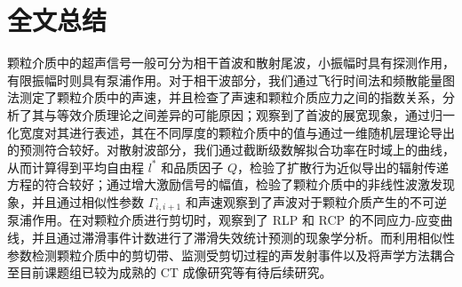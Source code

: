 
\chapter{全文总结}

颗粒介质中的超声信号一般可分为相干首波和散射尾波，小振幅时具有探测作用，有限振幅时则具有泵浦作用。对于相干波部分，我们通过飞行时间法和频散能量图法测定了颗粒介质中的声速，并且检查了声速和颗粒介质应力之间的指数关系，分析了其与等效介质理论之间差异的可能原因；观察到了首波的展宽现象，通过归一化宽度对其进行表述，其在不同厚度的颗粒介质中的值与通过一维随机层理论导出的预测符合较好。对散射波部分，我们通过截断级数解拟合功率在时域上的曲线，从而计算得到平均自由程 $l^{*}$ 和品质因子 $Q$，检验了扩散行为近似导出的辐射传递方程的符合较好；通过增大激励信号的幅值，检验了颗粒介质中的非线性波激发现象，并且通过相似性参数 $\Gamma_{i,i+1}$ 和声速观察到了声波对于颗粒介质产生的不可逆泵浦作用。在对颗粒介质进行剪切时，观察到了 RLP 和 RCP 的不同应力-应变曲线，并且通过滞滑事件计数进行了滞滑失效统计预测的现象学分析。而利用相似性参数检测颗粒介质中的剪切带、监测受剪切过程的声发射事件以及将声学方法耦合至目前课题组已较为成熟的 CT 成像研究等有待后续研究。